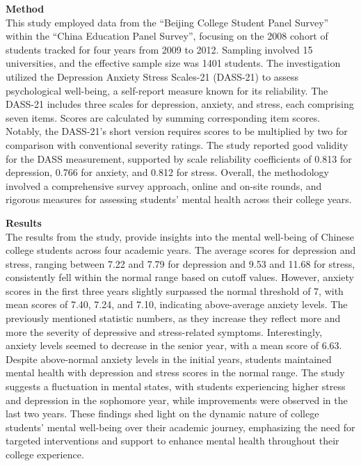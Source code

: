 \vspace{5mm}

\noindent \textbf{Method} \\
This study employed data from the ``Beijing College Student Panel Survey'' within the ``China Education Panel Survey'', focusing on the 2008 cohort of students tracked for four years from 2009 to 2012. Sampling involved 15 universities, and the effective sample size was 1401 students. The investigation utilized the Depression Anxiety Stress Scales-21 (DASS-21) to assess psychological well-being, a self-report measure known for its reliability. The DASS-21 includes three scales for depression, anxiety, and stress, each comprising seven items. Scores are calculated by summing corresponding item scores. Notably, the DASS-21's short version requires scores to be multiplied by two for comparison with conventional severity ratings. The study reported good validity for the DASS measurement, supported by scale reliability coefficients of 0.813 for depression, 0.766 for anxiety, and 0.812 for stress. Overall, the methodology involved a comprehensive survey approach, online and on-site rounds, and rigorous measures for assessing students' mental health across their college years.

\vspace{5mm}

\noindent \textbf{Results} \\
The results from the study, provide insights into the mental well-being of Chinese college students across four academic years. The average scores for depression and stress, ranging between 7.22 and 7.79 for depression and 9.53 and 11.68 for stress, consistently fell within the normal range based on cutoff values. However, anxiety scores in the first three years slightly surpassed the normal threshold of 7, with mean scores of 7.40, 7.24, and 7.10, indicating above-average anxiety levels. The previously mentioned statistic numbers, as they increase they reflect more and more the severity of depressive and stress-related symptoms. Interestingly, anxiety levels seemed to decrease in the senior year, with a mean score of 6.63. Despite above-normal anxiety levels in the initial years, students maintained mental health with depression and stress scores in the normal range. The study suggests a fluctuation in mental states, with students experiencing higher stress and depression in the sophomore year, while improvements were observed in the last two years. These findings shed light on the dynamic nature of college students' mental well-being over their academic journey, emphasizing the need for targeted interventions and support to enhance mental health throughout their college experience.

